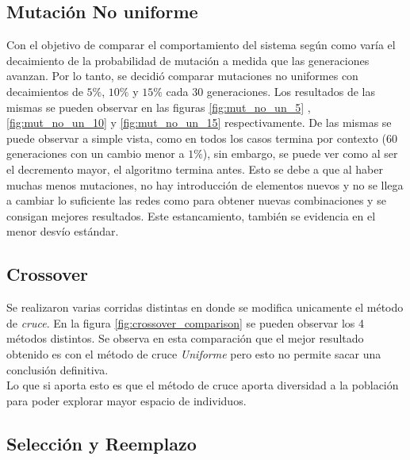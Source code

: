 \documentclass{sig-alternate}
\begin{document}
		\subsection{Mutación No uniforme}
		
		Con el objetivo de comparar el comportamiento del sistema según como varía el decaimiento de la probabilidad de mutación a medida que las generaciones avanzan. Por lo tanto, se decidió comparar mutaciones no uniformes con decaimientos de $5\%$, $10\%$ y $15\%$ cada 30 generaciones. Los resultados de las mismas se pueden observar en las figuras \ref{fig:mut_no_un_5} , \ref{fig:mut_no_un_10} y \ref{fig:mut_no_un_15} respectivamente. De las mismas se puede observar a simple vista, como en todos los casos termina por contexto (60 generaciones con un cambio menor a $1\%$), sin embargo, se puede ver como al ser el decremento mayor, el algoritmo termina antes. Esto se debe a que al haber muchas menos mutaciones, no hay introducción de elementos nuevos y no se llega a cambiar lo suficiente las redes como para obtener nuevas combinaciones y se consigan mejores resultados. Este estancamiento, también se evidencia en el menor desvío estándar.

		\subsection{Crossover}

		Se realizaron varias corridas distintas en donde se modifica unicamente el método de \textit{cruce}. En la figura \ref{fig:crossover_comparison} se pueden observar los 4 métodos distintos. Se observa en esta comparación que el mejor resultado obtenido es con el método de cruce \textit{Uniforme} pero esto no permite sacar una conclusión definitiva. \\
		Lo que si aporta esto es que el método de cruce aporta diversidad a la población para poder explorar mayor espacio de individuos.

		\subsection{Selección y Reemplazo}
\end{document}
